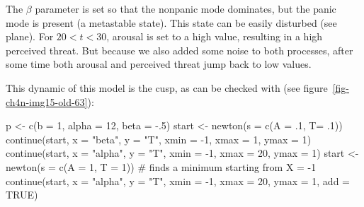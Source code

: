 \documentclass[
  a4paper,
  DIV=11,
  numbers=noendperiod,
  oneside]{scrreprt}
\newenvironment{Shaded}{}{}
\newcommand{\AttributeTok}[1]{\textcolor[rgb]{0.84,0.23,0.29}{#1}}
\newcommand{\CommentTok}[1]{\textcolor[rgb]{0.42,0.45,0.49}{#1}}
\newcommand{\ConstantTok}[1]{\textcolor[rgb]{0.00,0.36,0.77}{#1}}
\newcommand{\DecValTok}[1]{\textcolor[rgb]{0.00,0.36,0.77}{#1}}
\newcommand{\FunctionTok}[1]{\textcolor[rgb]{0.44,0.26,0.76}{#1}}
\newcommand{\NormalTok}[1]{\textcolor[rgb]{0.14,0.16,0.18}{#1}}
\newcommand{\OtherTok}[1]{\textcolor[rgb]{0.44,0.26,0.76}{#1}}
\newcommand{\SpecialCharTok}[1]{\textcolor[rgb]{0.00,0.36,0.77}{#1}}
\newcommand{\StringTok}[1]{\textcolor[rgb]{0.01,0.18,0.38}{#1}}
\begin{document}
The \(\beta\) parameter is set so that the nonpanic mode dominates, but
the panic mode is present (a metastable state). This state can be easily
disturbed (see plane). For \(20 < t < 30\), arousal is set to a high
value, resulting in a high perceived threat. But because we also added
some noise to both processes, after some time both arousal and perceived
threat jump back to low values.

This dynamic of this model is the cusp, as can be checked with (see
figure~\ref{fig-ch4n-img15-old-63}):

\begin{Shaded}
\begin{Highlighting}[]
\NormalTok{p }\OtherTok{\textless{}{-}} \FunctionTok{c}\NormalTok{(}\AttributeTok{b =} \DecValTok{1}\NormalTok{, }\AttributeTok{alpha =} \DecValTok{12}\NormalTok{, }\AttributeTok{beta =} \SpecialCharTok{{-}}\NormalTok{.}\DecValTok{5}\NormalTok{)}
\NormalTok{start }\OtherTok{\textless{}{-}} \FunctionTok{newton}\NormalTok{(}\AttributeTok{s =} \FunctionTok{c}\NormalTok{(}\AttributeTok{A =}\NormalTok{ .}\DecValTok{1}\NormalTok{,  }\AttributeTok{T=}\NormalTok{ .}\DecValTok{1}\NormalTok{)) }
\FunctionTok{continue}\NormalTok{(start, }\AttributeTok{x =} \StringTok{"beta"}\NormalTok{, }\AttributeTok{y =} \StringTok{"T"}\NormalTok{, }\AttributeTok{xmin =} \SpecialCharTok{{-}}\DecValTok{1}\NormalTok{, }\AttributeTok{xmax =} \DecValTok{1}\NormalTok{, }\AttributeTok{ymax =} \DecValTok{1}\NormalTok{) }
\FunctionTok{continue}\NormalTok{(start, }\AttributeTok{x =} \StringTok{"alpha"}\NormalTok{, }\AttributeTok{y =} \StringTok{"T"}\NormalTok{, }\AttributeTok{xmin =} \SpecialCharTok{{-}}\DecValTok{1}\NormalTok{, }\AttributeTok{xmax =} \DecValTok{20}\NormalTok{, }\AttributeTok{ymax =} \DecValTok{1}\NormalTok{) }
\NormalTok{start }\OtherTok{\textless{}{-}} \FunctionTok{newton}\NormalTok{(}\AttributeTok{s =} \FunctionTok{c}\NormalTok{(}\AttributeTok{A =} \DecValTok{1}\NormalTok{, }\AttributeTok{T =} \DecValTok{1}\NormalTok{)) }\CommentTok{\# finds a minimum starting from X = {-}1}
\FunctionTok{continue}\NormalTok{(start, }\AttributeTok{x =} \StringTok{"alpha"}\NormalTok{, }\AttributeTok{y =} \StringTok{"T"}\NormalTok{, }\AttributeTok{xmin =} \SpecialCharTok{{-}}\DecValTok{1}\NormalTok{, }\AttributeTok{xmax =} \DecValTok{20}\NormalTok{,}
        \AttributeTok{ymax =} \DecValTok{1}\NormalTok{, }\AttributeTok{add =} \ConstantTok{TRUE}\NormalTok{) }
\end{Highlighting}
\end{Shaded}
\end{document}
